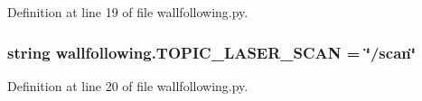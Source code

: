 Definition at line 19 of file wallfollowing.\+py.

\subsubsection[{\texorpdfstring{T\+O\+P\+I\+C\+\_\+\+L\+A\+S\+E\+R\+\_\+\+S\+C\+AN}{TOPIC_LASER_SCAN}}]{\setlength{\rightskip}{0pt plus 5cm}string wallfollowing.\+T\+O\+P\+I\+C\+\_\+\+L\+A\+S\+E\+R\+\_\+\+S\+C\+AN = \char`\"{}/scan\char`\"{}}\hypertarget{namespacewallfollowing_a7e38e617465ebdfa7ec0576ac63443f8}{}\label{namespacewallfollowing_a7e38e617465ebdfa7ec0576ac63443f8}


Definition at line 20 of file wallfollowing.\+py.


